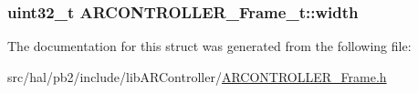 \subsubsection[{\texorpdfstring{width}{width}}]{\setlength{\rightskip}{0pt plus 5cm}uint32\+\_\+t A\+R\+C\+O\+N\+T\+R\+O\+L\+L\+E\+R\+\_\+\+Frame\+\_\+t\+::width}\hypertarget{struct_a_r_c_o_n_t_r_o_l_l_e_r___frame__t_ab41e19bcf0b5513cb2886c169d74d692}{}\label{struct_a_r_c_o_n_t_r_o_l_l_e_r___frame__t_ab41e19bcf0b5513cb2886c169d74d692}


The documentation for this struct was generated from the following file\+:\begin{DoxyCompactItemize}
\item 
src/hal/pb2/include/lib\+A\+R\+Controller/\hyperlink{_a_r_c_o_n_t_r_o_l_l_e_r___frame_8h}{A\+R\+C\+O\+N\+T\+R\+O\+L\+L\+E\+R\+\_\+\+Frame.\+h}\end{DoxyCompactItemize}
